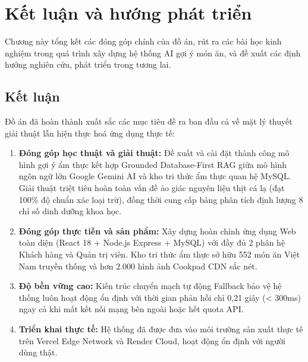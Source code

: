 \chapter{Kết luận và hướng phát triển}
\label{ch:ketluan}

\begin{muctieu}
Chương này tổng kết các đóng góp chính của đồ án, rút ra các bài học kinh nghiệm trong quá trình xây dựng hệ thống AI gợi ý món ăn, và đề xuất các định hướng nghiên cứu, phát triển trong tương lai.
\end{muctieu}

\section{Kết luận}

Đồ án  đã hoàn thành xuất sắc các mục tiêu đề ra ban đầu cả về mặt lý thuyết giải thuật lẫn hiện thực hoá ứng dụng thực tế:
\begin{enumerate}[leftmargin=1.6em, itemsep=2pt]
  \item \textbf{Đóng góp học thuật và giải thuật:} Đề xuất và cài đặt thành công mô hình gợi ý ẩm thực kết hợp Grounded Database-First RAG giữa mô hình ngôn ngữ lớn Google Gemini AI và kho tri thức ẩm thực quan hệ MySQL. Giải thuật triệt tiêu hoàn toàn vấn đề ảo giác nguyên liệu thịt cá lạ (đạt 100\% độ chuẩn xác loại trừ), đồng thời cung cấp bảng phân tích định lượng 8 chỉ số dinh dưỡng khoa học.
  \item \textbf{Đóng góp thực tiễn và sản phẩm:} Xây dựng hoàn chỉnh ứng dụng Web toàn diện (React 18 + Node.js Express + MySQL) với đầy đủ 2 phân hệ Khách hàng và Quản trị viên. Kho tri thức ẩm thực sở hữu 552 món ăn Việt Nam truyền thống và hơn 2.000 hình ảnh Cookpad CDN sắc nét.
  \item \textbf{Độ bền vững cao:} Kiến trúc chuyển mạch tự động Fallback bảo vệ hệ thống luôn hoạt động ổn định với thời gian phản hồi chỉ 0,21 giây (< 300ms) ngay cả khi mất kết nối mạng bên ngoài hoặc hết quota API.
  \item \textbf{Triển khai thực tế:} Hệ thống đã được đưa vào môi trường sản xuất thực tế trên Vercel Edge Network và Render Cloud, hoạt động ổn định với người dùng thật.
\end{enumerate}

